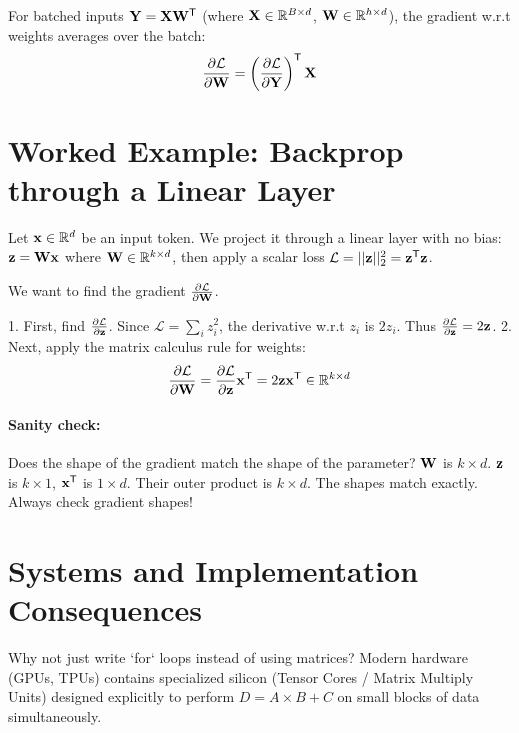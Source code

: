 For batched inputs $\mathbf{Y} = \mathbf{X} \mathbf{W}^{\mathsf{T}}$ (where $\mathbf{X} \in \mathbb{R}^{B \times d}$, $\mathbf{W} \in \mathbb{R}^{h \times d}$), the gradient w.r.t weights averages over the batch:
\begin{equation}
\frac{\partial \mathcal{L}}{\partial \mathbf{W}} = \left(\frac{\partial \mathcal{L}}{\partial \mathbf{Y}}\right)^{\mathsf{T}} \mathbf{X}
\end{equation}

\section{Worked Example: Backprop through a Linear Layer}
\label{ch:02:sec:example}

Let $\mathbf{x} \in \mathbb{R}^d$ be an input token. We project it through a linear layer with no bias: $\mathbf{z} = \mathbf{W} \mathbf{x}$ where $\mathbf{W} \in \mathbb{R}^{k \times d}$, then apply a scalar loss $\mathcal{L} = ||\mathbf{z}||_2^2 = \mathbf{z}^{\mathsf{T}} \mathbf{z}$.

We want to find the gradient $\frac{\partial \mathcal{L}}{\partial \mathbf{W}}$.

1. First, find $\frac{\partial \mathcal{L}}{\partial \mathbf{z}}$. Since $\mathcal{L} = \sum_i z_i^2$, the derivative w.r.t $z_i$ is $2z_i$. Thus $\frac{\partial \mathcal{L}}{\partial \mathbf{z}} = 2\mathbf{z}$.
2. Next, apply the matrix calculus rule for weights:
\begin{equation}
\frac{\partial \mathcal{L}}{\partial \mathbf{W}} = \frac{\partial \mathcal{L}}{\partial \mathbf{z}} \mathbf{x}^{\mathsf{T}} = 2\mathbf{z} \mathbf{x}^{\mathsf{T}} \in \mathbb{R}^{k \times d}
\end{equation}

\paragraph{Sanity check:} Does the shape of the gradient match the shape of the parameter? $\mathbf{W}$ is $k \times d$. $\mathbf{z}$ is $k \times 1$, $\mathbf{x}^{\mathsf{T}}$ is $1 \times d$. Their outer product is $k \times d$. The shapes match exactly. Always check gradient shapes!

\section{Systems and Implementation Consequences}
\label{ch:02:sec:systems}

Why not just write `for` loops instead of using matrices? 
Modern hardware (GPUs, TPUs) contains specialized silicon (Tensor Cores / Matrix Multiply Units) designed explicitly to perform $D = A \times B + C$ on small blocks of data simultaneously. 

